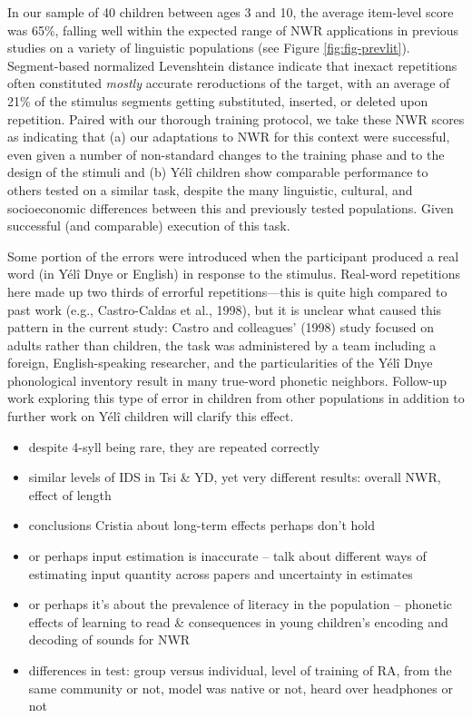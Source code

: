 \documentclass[english,,man,floatsintext]{apa6}
\providecommand{\tightlist}{%
  \setlength{\itemsep}{0pt}\setlength{\parskip}{0pt}}
\begin{document}
In our sample of 40 children between ages 3 and 10, the average item-level score was 65\%, falling well within the expected range of NWR applications in previous studies on a variety of linguistic populations (see Figure \ref{fig:fig-prevlit}). Segment-based normalized Levenshtein distance indicate that inexact repetitions often constituted \emph{mostly} accurate reroductions of the target, with an average of 21\% of the stimulus segments getting substituted, inserted, or deleted upon repetition. Paired with our thorough training protocol, we take these NWR scores as indicating that (a) our adaptations to NWR for this context were successful, even given a number of non-standard changes to the training phase and to the design of the stimuli and (b) Yélî children show comparable performance to others tested on a similar task, despite the many linguistic, cultural, and socioeconomic differences between this and previously tested populations. Given successful (and comparable) execution of this task.

Some portion of the errors were introduced when the participant produced a real word (in Yélî Dnye or English) in response to the stimulus. Real-word repetitions here made up two thirds of errorful repetitions---this is quite high compared to past work (e.g., Castro-Caldas et al., 1998), but it is unclear what caused this pattern in the current study: Castro and colleagues' (1998) study focused on adults rather than children, the task was administered by a team including a foreign, English-speaking researcher, and the particularities of the Yélî Dnye phonological inventory result in many true-word phonetic neighbors. Follow-up work exploring this type of error in children from other populations in addition to further work on Yélî children will clarify this effect.

\begin{itemize}
\tightlist
\item
  despite 4-syll being rare, they are repeated correctly
\item
  similar levels of IDS in Tsi \& YD, yet very different results: overall NWR, effect of length
\item
  conclusions Cristia about long-term effects perhaps don't hold
\item
  or perhaps input estimation is inaccurate -- talk about different ways of estimating input quantity across papers and uncertainty in estimates
\item
  or perhaps it's about the prevalence of literacy in the population -- phonetic effects of learning to read \& consequences in young children's encoding and decoding of sounds for NWR
\item
  differences in test: group versus individual, level of training of RA, from the same community or not, model was native or not, heard over headphones or not
\end{itemize}
\end{document}
